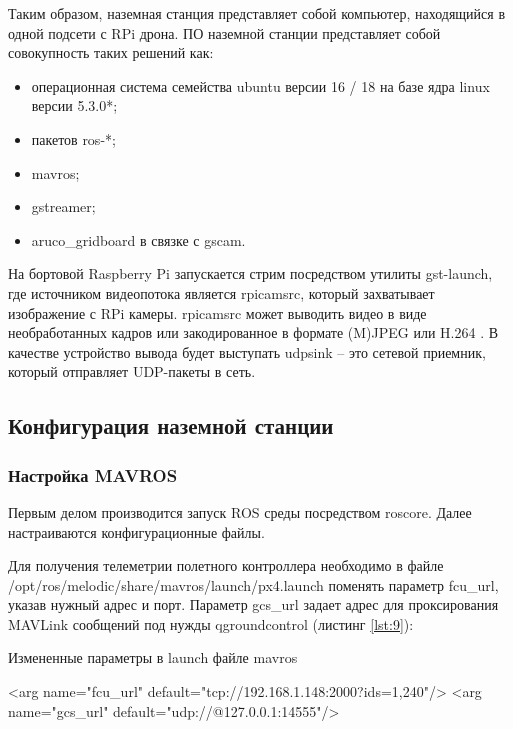 Таким образом, наземная станция представляет собой компьютер, находящийся в одной подсети с RPi дрона.
ПО наземной станции представляет собой совокупность таких решений как:
\begin{itemize}
	\item операционная система семейства ubuntu версии 16 / 18 на базе ядра linux версии 5.3.0*;
	\item пакетов ros-*;
	\item mavros;
	\item gstreamer;
	\item aruco\_gridboard в связке с gscam.
\end{itemize}
На бортовой Raspberry Pi запускается стрим посредством утилиты gst-launch, где источником видеопотока является rpicamsrc, который захватывает изображение с RPi камеры. rpicamsrc может выводить видео в виде необработанных кадров или закодированное в формате (M)JPEG или H.264 \cite{gstreamer1}. В качестве устройство вывода будет выступать udpsink -- это сетевой приемник, который отправляет UDP-пакеты в сеть.

\subsection{Конфигурация наземной станции}

\subsubsection{Настройка MAVROS}

Первым делом производится запуск ROS среды посредством roscore. Далее настраиваются конфигурационные файлы.

Для получения телеметрии полетного контроллера необходимо в файле /opt/ros/melodic/share/mavros/launch/px4.launch поменять параметр fcu\_url, указав нужный адрес и порт. Параметр gcs\_url задает адрес для проксирования MAVLink сообщений под нужды qgroundcontrol (листинг \ref{lst:9}):
\begin{Program}[H]
	\caption{Измененные параметры в launch файле mavros} \label{lst:9}
	\begin{MyCode}
	<arg name="fcu_url" default="tcp://192.168.1.148:2000?ids=1,240"/>   
	<arg name="gcs_url" default="udp://@127.0.0.1:14555"/>
	\end{MyCode}
\end{Program}

